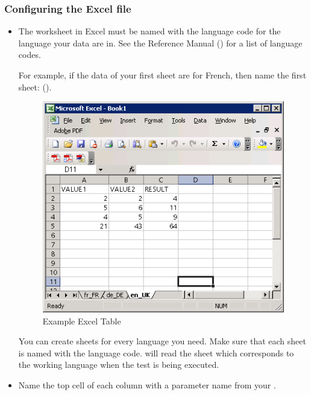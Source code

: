 \subsubsection{Configuring the Excel file}
\label{TasksConfigureExcel}
\begin{itemize}
\item The worksheet in Excel must be named with the language code for the language your data are in. See the Reference Manual () for a list of language codes.

For example, if the data of your first sheet are for French, then name the first sheet:  ().

\begin{figure}[h]
\begin{center}
\includegraphics{Tasks/Testdata/PS/excelexample}
\caption{Example Excel Table}
\label{excel}
\end{center}
\end{figure}

You can create sheets for every language you need. Make sure that each sheet is named with the language code. 
\gd{} will read the sheet which corresponds to the working language when the test is being executed. 

\item Name the top cell of each column with a parameter name from your \gdcase{}.


\end{itemize}
